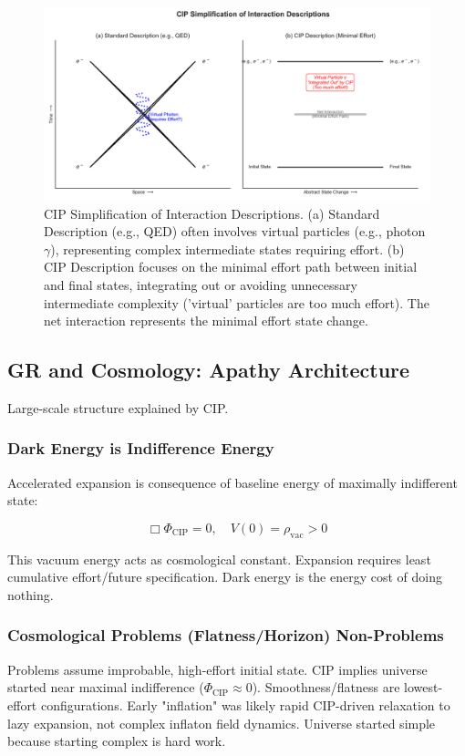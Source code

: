 \documentclass[11pt, a4paper]{article}
\newcommand{\subt}[1]{\mathrm{#1}}
\begin{document}
\begin{figure}[H]
    \centering
    \includegraphics[width=\textwidth]{CIP_Interactions.png}
    \caption[CIP Simplification of Interaction Descriptions]{CIP Simplification of Interaction Descriptions. (a) Standard Description (e.g., QED) often involves virtual particles (e.g., photon $\gamma$), representing complex intermediate states requiring effort. (b) CIP Description focuses on the minimal effort path between initial and final states, integrating out or avoiding unnecessary intermediate complexity ('virtual' particles are too much effort). The net interaction represents the minimal effort state change.}
    \label{fig:interactions}
\end{figure}

\subsection{GR and Cosmology: Apathy Architecture}

Large-scale structure explained by CIP.

\subsubsection{Dark Energy is Indifference Energy}
Accelerated expansion is consequence of baseline energy of maximally indifferent state:

\begin{equation}
    \label{eq:dark_energy_cip}
    \Box \Phi_{\text{CIP}} = 0, \quad V(0) = \rho_{\text{vac}} > 0
\end{equation}


This vacuum energy acts as cosmological constant. Expansion requires least cumulative effort/future specification. Dark energy is the energy cost of doing nothing.

\subsubsection{Cosmological Problems (Flatness/Horizon) Non-Problems}
Problems assume improbable, high-effort initial state. CIP implies universe started near maximal indifference ($\Phi_{\subt{CIP}} \approx 0$). Smoothness/flatness are lowest-effort configurations. Early "inflation" was likely rapid CIP-driven relaxation to lazy expansion, not complex inflaton field dynamics. Universe started simple because starting complex is hard work.
\end{document}
